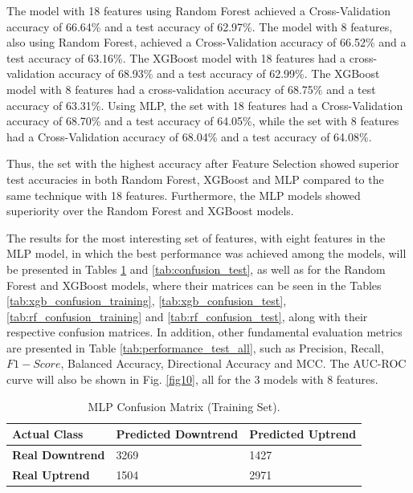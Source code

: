 \documentclass{ieeeaccess}
\begin{document}
The model with 18 features using Random Forest achieved a Cross-Validation accuracy of 66.64\% and a test accuracy of 62.97\%. The model with 8 features, also using Random Forest, achieved a Cross-Validation accuracy of 66.52\% and a test accuracy of 63.16\%. The XGBoost model with 18 features had a cross-validation accuracy of 68.93\% and a test accuracy of 62.99\%. The XGBoost model with 8 features had a cross-validation accuracy of 68.75\% and a test accuracy of 63.31\%. Using MLP, the set with 18 features had a Cross-Validation accuracy of 68.70\% and a test accuracy of 64.05\%, while the set with 8 features had a Cross-Validation accuracy of 68.04\% and a test accuracy of 64.08\%.

Thus, the set with the highest accuracy after Feature Selection showed superior test accuracies in both Random Forest, XGBoost and MLP compared to the same technique with 18 features. Furthermore, the MLP models showed superiority over the Random Forest and XGBoost models.

The results for the most interesting set of features, with eight features in the MLP model, in which the best performance was achieved among the models, will be presented in Tables \ref{tab:confusion_training} and \ref{tab:confusion_test}, as well as for the Random Forest and XGBoost models, where their matrices can be seen in the Tables \ref{tab:xgb_confusion_training}, \ref{tab:xgb_confusion_test}, \ref{tab:rf_confusion_training} and \ref{tab:rf_confusion_test}, along with their respective confusion matrices. In addition, other fundamental evaluation metrics are presented in Table \ref{tab:performance_test_all}, such as Precision, Recall, $F1-Score$, Balanced Accuracy, Directional Accuracy and MCC. The AUC-ROC curve will also be shown in Fig. \ref{fig10}, all for the 3 models with 8 features.

\begin{table}[!ht]
\caption{MLP Confusion Matrix (Training Set).}
\label{tab:confusion_training}
\setlength{\tabcolsep}{3pt}
\begin{tabular}{|p{75pt}|p{70pt}|p{70pt}|}
\hline
\textbf{Actual Class} & \textbf{Predicted Downtrend} & \textbf{Predicted Uptrend} \\ 
\hline
\textbf{Real Downtrend} & 3269 & 1427 \\
\textbf{Real Uptrend} & 1504 & 2971 \\ 
\hline
\end{tabular}
\end{table}
\end{document}
